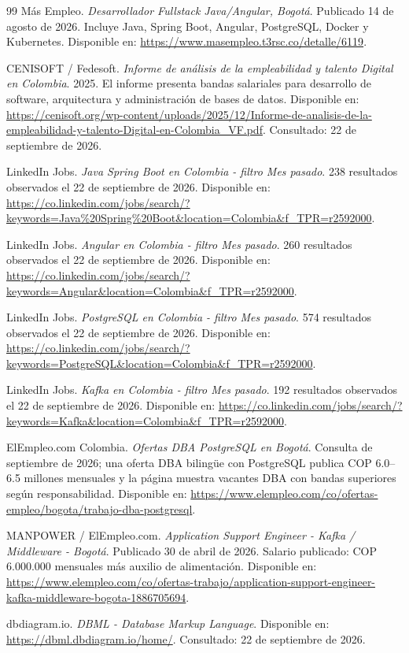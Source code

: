 \documentclass[12pt,a4paper]{article}
\begin{document}
\begin{thebibliography}{99}
Más Empleo. \textit{Desarrollador Fullstack Java/Angular, Bogotá}. Publicado 14 de agosto de 2026. Incluye Java, Spring Boot, Angular, PostgreSQL, Docker y Kubernetes. Disponible en: \url{https://www.masempleo.t3rsc.co/detalle/6119}.


CENISOFT / Fedesoft. \textit{Informe de análisis de la empleabilidad y talento Digital en Colombia}. 2025. El informe presenta bandas salariales para desarrollo de software, arquitectura y administración de bases de datos. Disponible en: \url{https://cenisoft.org/wp-content/uploads/2025/12/Informe-de-analisis-de-la-empleabilidad-y-talento-Digital-en-Colombia_VF.pdf}. Consultado: 22 de septiembre de 2026.

LinkedIn Jobs. \textit{Java Spring Boot en Colombia - filtro Mes pasado}. 238 resultados observados el 22 de septiembre de 2026. Disponible en: \url{https://co.linkedin.com/jobs/search/?keywords=Java%20Spring%20Boot&location=Colombia&f_TPR=r2592000}.

LinkedIn Jobs. \textit{Angular en Colombia - filtro Mes pasado}. 260 resultados observados el 22 de septiembre de 2026. Disponible en: \url{https://co.linkedin.com/jobs/search/?keywords=Angular&location=Colombia&f_TPR=r2592000}.

LinkedIn Jobs. \textit{PostgreSQL en Colombia - filtro Mes pasado}. 574 resultados observados el 22 de septiembre de 2026. Disponible en: \url{https://co.linkedin.com/jobs/search/?keywords=PostgreSQL&location=Colombia&f_TPR=r2592000}.

LinkedIn Jobs. \textit{Kafka en Colombia - filtro Mes pasado}. 192 resultados observados el 22 de septiembre de 2026. Disponible en: \url{https://co.linkedin.com/jobs/search/?keywords=Kafka&location=Colombia&f_TPR=r2592000}.

ElEmpleo.com Colombia. \textit{Ofertas DBA PostgreSQL en Bogotá}. Consulta de septiembre de 2026; una oferta DBA bilingüe con PostgreSQL publica COP 6.0--6.5 millones mensuales y la página muestra vacantes DBA con bandas superiores según responsabilidad. Disponible en: \url{https://www.elempleo.com/co/ofertas-empleo/bogota/trabajo-dba-postgresql}.

MANPOWER / ElEmpleo.com. \textit{Application Support Engineer - Kafka / Middleware - Bogotá}. Publicado 30 de abril de 2026. Salario publicado: COP 6.000.000 mensuales más auxilio de alimentación. Disponible en: \url{https://www.elempleo.com/co/ofertas-trabajo/application-support-engineer-kafka-middleware-bogota-1886705694}.



dbdiagram.io. \textit{DBML - Database Markup Language}. Disponible en: \url{https://dbml.dbdiagram.io/home/}. Consultado: 22 de septiembre de 2026.

\end{thebibliography}
\end{document}
